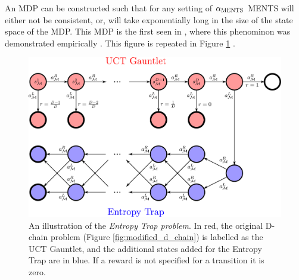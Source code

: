             








        
        An MDP can be constructed such that for any setting of ${\alpha_{{\textnormal{MENTS}}}}$ MENTS will either not be consistent, or, will take exponentially long in the size of the state space of the MDP. This MDP is the  first seen in , where this phenominon was demonstrated empirically . This figure is repeated in Figure \ref{fig:entropy_trap_repeat} .



        \begin{figure}
            \centering
            \includegraphics[width=\textwidth]{figures/ch4/entropy_trap_mdp_colour.pdf}
            \caption[An illustration of the \textit{Entropy Trap problem}.]{An illustration of the \textit{Entropy Trap problem}. In red, the original D-chain problem (Figure \ref{fig:modified_d_chain}) is labelled as the UCT Gauntlet, and the additional states added for the Entropy Trap are in blue. If a reward is not specified for a transition it is zero. }
            \label{fig:entropy_trap_repeat}
        \end{figure}
        
